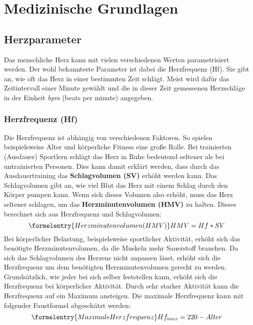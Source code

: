 
\chapter{Medizinische Grundlagen}

\section{Herzparameter}
Das menschliche Herz kann mit vielen verschiedenen Werten parametrisiert werden. Der wohl bekannteste Parameter ist dabei die Herzfrequenz (Hf). Sie gibt an, wie oft das Herz in einer bestimmten Zeit schlägt. Meist wird dafür das Zeitintervall einer Minute gewählt und die in dieser Zeit gemessenen Herzschläge in der Einheit \emph{bpm} (beats per minute) angegeben. 
\subsection{Herzfrequenz (Hf)} \label {subsec:hf}
Die Herzfrequenz ist abhängig von verschiedenen Faktoren. So spielen beispielsweise Alter und körperliche Fitness eine große Rolle. Bei trainierten (Ausdauer) Sportlern schlägt das Herz in Ruhe bedeutend seltener als bei untrainierten Personen. Dies kann damit erklärt werden, dass durch das Ausdauertraining das \textbf{Schlagvolumen (SV)} erhöht werden kann. Das Schlagvolumen gibt an, wie viel Blut das Herz mit einem Schlag durch den Körper pumpen kann. Wenn sich dieses Volumen also erhöht, muss das Herz seltener schlagen, um das \textbf{Herzminutenvolumen (HMV)} zu halten. Dieses berechnet sich aus Herzfrequenz und Schlagvolumen:
\begin{equation}\formelentry{Herzminutenvolumen (HMV)}
	HMV = Hf * SV
\end{equation} 
Bei körperlicher Belastung, beispielsweise sportlicher Aktivität, erhöht sich das benötigte Herzminutenvolumen, da die Muskeln mehr Sauerstoff brauchen. Da sich das Schlagvolumen des Herzens nicht anpassen lässt, erhöht sich die Herzfrequenz um dem benötigten Herzminutenvolumen gerecht zu werden. Grundsätzlich, wie jeder bei sich selber feststellen kann, erhöht sich die Herzfrequenz bei körperlicher Aktivität. Durch sehr starker Aktivität kann die Herzfrequenz auf ein Maximum ansteigen. Die maximale Herzfrequenz kann mit folgender Faustformel abgeschätzt werden: 
\begin{equation}\formelentry{Maximale Herzfrequenz}
	Hf_{max} = 220 - Alter
\end{equation}
